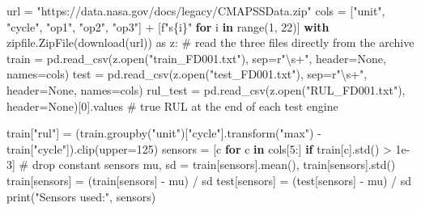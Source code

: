 \documentclass[
  letterpaper,
  DIV=11,
  numbers=noendperiod]{scrreprt}
\newenvironment{Shaded}{\begin{snugshade}}{\end{snugshade}}
\newcommand{\BuiltInTok}[1]{\textcolor[rgb]{0.00,0.23,0.31}{#1}}
\newcommand{\CommentTok}[1]{\textcolor[rgb]{0.37,0.37,0.37}{#1}}
\newcommand{\ControlFlowTok}[1]{\textcolor[rgb]{0.00,0.23,0.31}{\textbf{#1}}}
\newcommand{\DecValTok}[1]{\textcolor[rgb]{0.68,0.00,0.00}{#1}}
\newcommand{\FloatTok}[1]{\textcolor[rgb]{0.68,0.00,0.00}{#1}}
\newcommand{\ImportTok}[1]{\textcolor[rgb]{0.00,0.46,0.62}{#1}}
\newcommand{\KeywordTok}[1]{\textcolor[rgb]{0.00,0.23,0.31}{\textbf{#1}}}
\newcommand{\NormalTok}[1]{\textcolor[rgb]{0.00,0.23,0.31}{#1}}
\newcommand{\OperatorTok}[1]{\textcolor[rgb]{0.37,0.37,0.37}{#1}}
\newcommand{\SpecialCharTok}[1]{\textcolor[rgb]{0.37,0.37,0.37}{#1}}
\newcommand{\SpecialStringTok}[1]{\textcolor[rgb]{0.13,0.47,0.30}{#1}}
\newcommand{\StringTok}[1]{\textcolor[rgb]{0.13,0.47,0.30}{#1}}
\newcommand{\VariableTok}[1]{\textcolor[rgb]{0.07,0.07,0.07}{#1}}
\newcommand{\VerbatimStringTok}[1]{\textcolor[rgb]{0.13,0.47,0.30}{#1}}
\begin{document}
\begin{Shaded}
\begin{Highlighting}[]
\NormalTok{url }\OperatorTok{=} \StringTok{"https://data.nasa.gov/docs/legacy/CMAPSSData.zip"}
\NormalTok{cols }\OperatorTok{=}\NormalTok{ [}\StringTok{"unit"}\NormalTok{, }\StringTok{"cycle"}\NormalTok{, }\StringTok{"op1"}\NormalTok{, }\StringTok{"op2"}\NormalTok{, }\StringTok{"op3"}\NormalTok{] }\OperatorTok{+}\NormalTok{ [}\SpecialStringTok{f"s}\SpecialCharTok{\{}\NormalTok{i}\SpecialCharTok{\}}\SpecialStringTok{"} \ControlFlowTok{for}\NormalTok{ i }\KeywordTok{in} \BuiltInTok{range}\NormalTok{(}\DecValTok{1}\NormalTok{, }\DecValTok{22}\NormalTok{)]}
\ControlFlowTok{with}\NormalTok{ zipfile.ZipFile(download(url)) }\ImportTok{as}\NormalTok{ z:         }\CommentTok{\# read the three files directly from the archive}
\NormalTok{    train }\OperatorTok{=}\NormalTok{ pd.read\_csv(z.}\BuiltInTok{open}\NormalTok{(}\StringTok{"train\_FD001.txt"}\NormalTok{), sep}\OperatorTok{=}\VerbatimStringTok{r"\textbackslash{}s+"}\NormalTok{, header}\OperatorTok{=}\VariableTok{None}\NormalTok{, names}\OperatorTok{=}\NormalTok{cols)}
\NormalTok{    test }\OperatorTok{=}\NormalTok{ pd.read\_csv(z.}\BuiltInTok{open}\NormalTok{(}\StringTok{"test\_FD001.txt"}\NormalTok{), sep}\OperatorTok{=}\VerbatimStringTok{r"\textbackslash{}s+"}\NormalTok{, header}\OperatorTok{=}\VariableTok{None}\NormalTok{, names}\OperatorTok{=}\NormalTok{cols)}
\NormalTok{    rul\_test }\OperatorTok{=}\NormalTok{ pd.read\_csv(z.}\BuiltInTok{open}\NormalTok{(}\StringTok{"RUL\_FD001.txt"}\NormalTok{), header}\OperatorTok{=}\VariableTok{None}\NormalTok{)[}\DecValTok{0}\NormalTok{].values   }\CommentTok{\# true RUL at the end of each test engine}

\NormalTok{train[}\StringTok{"rul"}\NormalTok{] }\OperatorTok{=}\NormalTok{ (train.groupby(}\StringTok{"unit"}\NormalTok{)[}\StringTok{"cycle"}\NormalTok{].transform(}\StringTok{"max"}\NormalTok{) }\OperatorTok{{-}}\NormalTok{ train[}\StringTok{"cycle"}\NormalTok{]).clip(upper}\OperatorTok{=}\DecValTok{125}\NormalTok{)}
\NormalTok{sensors }\OperatorTok{=}\NormalTok{ [c }\ControlFlowTok{for}\NormalTok{ c }\KeywordTok{in}\NormalTok{ cols[}\DecValTok{5}\NormalTok{:] }\ControlFlowTok{if}\NormalTok{ train[c].std() }\OperatorTok{\textgreater{}} \FloatTok{1e{-}3}\NormalTok{]       }\CommentTok{\# drop constant sensors}
\NormalTok{mu, sd }\OperatorTok{=}\NormalTok{ train[sensors].mean(), train[sensors].std()}
\NormalTok{train[sensors] }\OperatorTok{=}\NormalTok{ (train[sensors] }\OperatorTok{{-}}\NormalTok{ mu) }\OperatorTok{/}\NormalTok{ sd}
\NormalTok{test[sensors] }\OperatorTok{=}\NormalTok{ (test[sensors] }\OperatorTok{{-}}\NormalTok{ mu) }\OperatorTok{/}\NormalTok{ sd}
\BuiltInTok{print}\NormalTok{(}\StringTok{"Sensors used:"}\NormalTok{, sensors)}
\end{Highlighting}
\end{Shaded}
\end{document}
